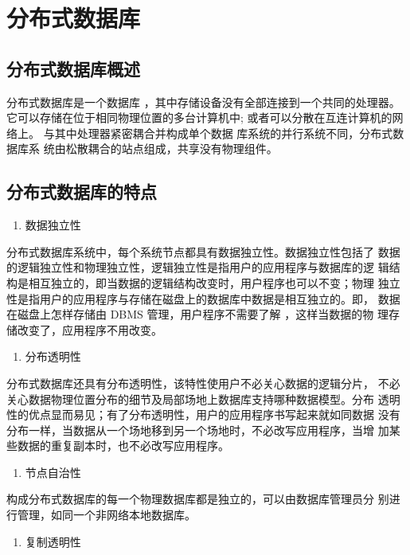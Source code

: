 \section{分布式数据库}
\subsection{分布式数据库概述}
分布式数据库是一个数据库
，其中存储设备没有全部连接到一个共同的处理器。
它可以存储在位于相同物理位置的多台计算机中; 
或者可以分散在互连计算机的网络上。
与其中处理器紧密耦合并构成单个数据
库系统的并行系统不同，分布式数据库系
统由松散耦合的站点组成，共享没有物理组件。
\subsection{分布式数据库的特点}

	\begin{enumerate}
		\item 数据独立性
	\end{enumerate}

	分布式数据库系统中，每个系统节点都具有数据独立性。数据独立性包括了
	数据的逻辑独立性和物理独立性，逻辑独立性是指用户的应用程序与数据库的逻
	辑结构是相互独立的，即当数据的逻辑结构改变时，用户程序也可以不变；物理
	独立性是指用户的应用程序与存储在磁盘上的数据库中数据是相互独立的。即，
	数据在磁盘上怎样存储由 DBMS 管理，用户程序不需要了解 ，这样当数据的物
	理存储改变了，应用程序不用改变。
	

	\begin{enumerate}[resume]
		\item 分布透明性
	\end{enumerate}

	分布式数据库还具有分布透明性，该特性使用户不必关心数据的逻辑分片，
	不必关心数据物理位置分布的细节及局部场地上数据库支持哪种数据模型。分布
	透明性的优点显而易见；有了分布透明性，用户的应用程序书写起来就如同数据
	没有分布一样，当数据从一个场地移到另一个场地时，不必改写应用程序，当增
	加某些数据的重复副本时，也不必改写应用程序。

	\begin{enumerate}[resume]
		\item 节点自治性
	\end{enumerate}

	构成分布式数据库的每一个物理数据库都是独立的，可以由数据库管理员分
	别进行管理，如同一个非网络本地数据库。

	\begin{enumerate}[resume]
		\item 复制透明性
	\end{enumerate}

